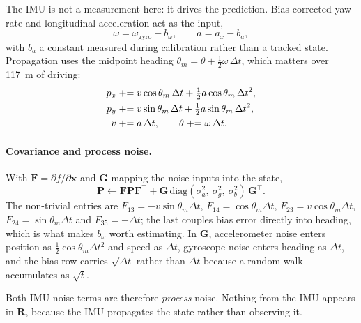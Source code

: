 The IMU is not a measurement here: it drives the prediction. Bias-corrected yaw
rate and longitudinal acceleration act as the input,
\begin{equation}
  \omega = \omega_{\text{gyro}} - b_\omega, \qquad a = a_x - b_a,
  \label{eq:ekf-input}
\end{equation}
with $b_a$ a constant measured during calibration rather than a tracked state.
Propagation uses the midpoint heading $\theta_m = \theta + \tfrac{1}{2}\omega\,\Delta t$,
which matters over \SI{117}{\metre} of driving:
\begin{align}
  p_x &\mathrel{+}= v\cos\theta_m\,\Delta t + \tfrac{1}{2}a\cos\theta_m\,\Delta t^2, \notag\\
  p_y &\mathrel{+}= v\sin\theta_m\,\Delta t + \tfrac{1}{2}a\sin\theta_m\,\Delta t^2, \notag\\
  v   &\mathrel{+}= a\,\Delta t, \qquad \theta \mathrel{+}= \omega\,\Delta t.
  \label{eq:ekf-propagate}
\end{align}

\paragraph{Covariance and process noise.} With $\mathbf{F}=\partial f/\partial
\mathbf{x}$ and $\mathbf{G}$ mapping the noise inputs into the state,
\begin{equation}
  \mathbf{P} \leftarrow \mathbf{F}\mathbf{P}\mathbf{F}^{\top}
    + \mathbf{G}\,\mathrm{diag}(\sigma_a^2,\ \sigma_g^2,\ \sigma_{b}^2)\,\mathbf{G}^{\top}.
  \label{eq:ekf-predict}
\end{equation}
The non-trivial entries are
$F_{13}=-v\sin\theta_m\Delta t$, $F_{14}=\cos\theta_m\Delta t$,
$F_{23}=v\cos\theta_m\Delta t$, $F_{24}=\sin\theta_m\Delta t$ and
$F_{35}=-\Delta t$; the last couples bias error directly into heading, which is
what makes $b_\omega$ worth estimating. In $\mathbf{G}$, accelerometer noise
enters position as $\tfrac{1}{2}\cos\theta_m\Delta t^2$ and speed as $\Delta t$,
gyroscope noise enters heading as $\Delta t$, and the bias row carries
$\sqrt{\Delta t}$ rather than $\Delta t$ because a random walk accumulates as
$\sqrt{t}$.

Both IMU noise terms are therefore \emph{process} noise. Nothing from the IMU
appears in $\mathbf{R}$, because the IMU propagates the state rather than
observing it.

